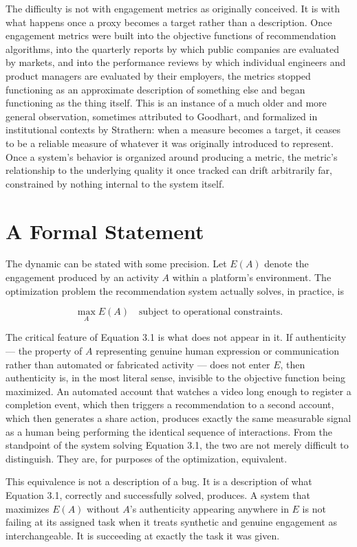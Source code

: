 \documentclass[12pt,a4paper]{book}
\begin{document}
The difficulty is not with engagement metrics as originally conceived. It is with what happens once a proxy becomes a target rather than a description. Once engagement metrics were built into the objective functions of recommendation algorithms, into the quarterly reports by which public companies are evaluated by markets, and into the performance reviews by which individual engineers and product managers are evaluated by their employers, the metrics stopped functioning as an approximate description of something else and began functioning as the thing itself. This is an instance of a much older and more general observation, sometimes attributed to Goodhart, and formalized in institutional contexts by Strathern: when a measure becomes a target, it ceases to be a reliable measure of whatever it was originally introduced to represent. Once a system's behavior is organized around producing a metric, the metric's relationship to the underlying quality it once tracked can drift arbitrarily far, constrained by nothing internal to the system itself.

\section{A Formal Statement}

The dynamic can be stated with some precision. Let $E(A)$ denote the engagement produced by an activity $A$ within a platform's environment. The optimization problem the recommendation system actually solves, in practice, is

\[\max_A E(A) \quad \text{subject to operational constraints.} \tag{3.1}\]

The critical feature of Equation 3.1 is what does not appear in it. If authenticity — the property of $A$ representing genuine human expression or communication rather than automated or fabricated activity — does not enter $E$, then authenticity is, in the most literal sense, invisible to the objective function being maximized. An automated account that watches a video long enough to register a completion event, which then triggers a recommendation to a second account, which then generates a share action, produces exactly the same measurable signal as a human being performing the identical sequence of interactions. From the standpoint of the system solving Equation 3.1, the two are not merely difficult to distinguish. They are, for purposes of the optimization, equivalent.

This equivalence is not a description of a bug. It is a description of what Equation 3.1, correctly and successfully solved, produces. A system that maximizes $E(A)$ without $A$'s authenticity appearing anywhere in $E$ is not failing at its assigned task when it treats synthetic and genuine engagement as interchangeable. It is succeeding at exactly the task it was given.
\end{document}
